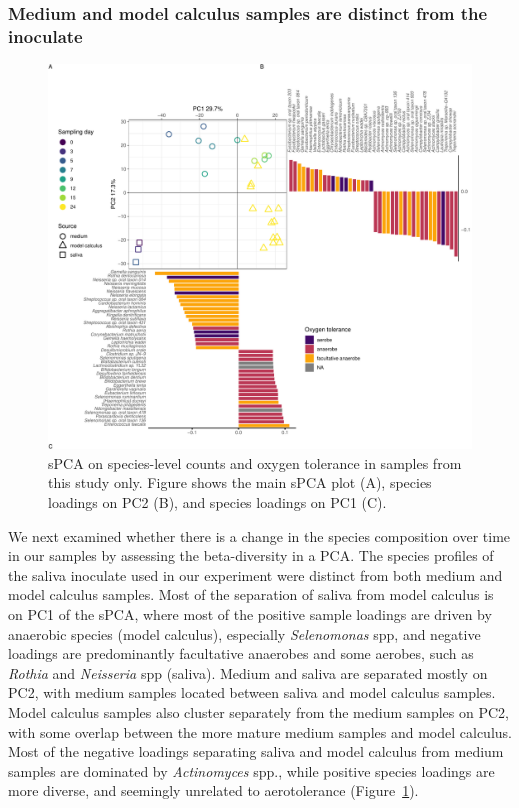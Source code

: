 \documentclass[
  b5paper,
]{book}
\begin{document}
\hypertarget{medium-and-model-calculus-samples-are-distinct-from-the-inoculate}{%
\subsubsection{Medium and model calculus samples are distinct from the
inoculate}\label{medium-and-model-calculus-samples-are-distinct-from-the-inoculate}}

\begin{figure}

{\centering \includegraphics{figures/byoc-valid-fig-spca-byoc-1.pdf}

}

\caption{\label{fig-spca-byoc}sPCA on species-level counts and oxygen
tolerance in samples from this study only. Figure shows the main sPCA
plot (A), species loadings on PC2 (B), and species loadings on PC1 (C).}

\end{figure}

We next examined whether there is a change in the species composition
over time in our samples by assessing the beta-diversity in a PCA. The
species profiles of the saliva inoculate used in our experiment were
distinct from both medium and model calculus samples. Most of the
separation of saliva from model calculus is on PC1 of the sPCA, where
most of the positive sample loadings are driven by anaerobic species
(model calculus), especially \emph{Selenomonas} spp, and negative
loadings are predominantly facultative anaerobes and some aerobes, such
as \emph{Rothia} and \emph{Neisseria} spp (saliva). Medium and saliva
are separated mostly on PC2, with medium samples located between saliva
and model calculus samples. Model calculus samples also cluster
separately from the medium samples on PC2, with some overlap between the
more mature medium samples and model calculus. Most of the negative
loadings separating saliva and model calculus from medium samples are
dominated by \emph{Actinomyces} spp., while positive species loadings
are more diverse, and seemingly unrelated to aerotolerance
(Figure~\ref{fig-spca-byoc}).
\end{document}
